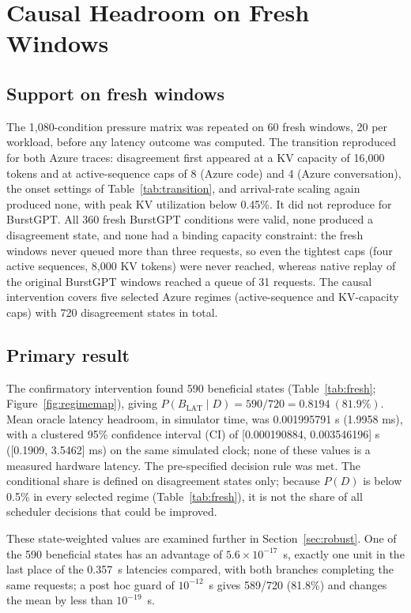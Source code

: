 \documentclass[preprint,12pt]{elsarticle}
\begin{document}
\section{Causal Headroom on Fresh Windows}
\label{sec:fresh}

\subsection{Support on fresh windows}
The 1,080-condition pressure matrix was repeated on 60 fresh windows, 20 per
workload, before any latency outcome was computed. The transition reproduced
for both Azure traces: disagreement first appeared at a KV capacity of 16,000
tokens and at active-sequence caps of 8 (Azure code) and 4 (Azure conversation),
the onset settings of Table~\ref{tab:transition}, and arrival-rate scaling again
produced none, with peak KV utilization below 0.45\%. It did not
reproduce for BurstGPT. All 360 fresh BurstGPT conditions were valid, none
produced a disagreement state, and none had a binding capacity constraint: the
fresh windows never queued more than three requests, so even the tightest
caps (four active sequences, 8,000 KV tokens) were never reached, whereas native
replay of the original BurstGPT windows reached a queue of 31 requests. The
causal intervention covers five selected Azure regimes
(active-sequence and KV-capacity caps) with 720 disagreement states in total.

\subsection{Primary result}
The confirmatory intervention found 590 beneficial
states (Table~\ref{tab:fresh}; Figure~\ref{fig:regimemap}), giving
$P(B_{\mathrm{LAT}}\mid D)=590/720=0.8194\ (81.9\%)$.
Mean oracle latency headroom, in simulator time, was 0.001995791 s (1.9958 ms),
with a clustered 95\% confidence interval (CI) of [0.000190884, 0.003546196] s
([0.1909, 3.5462] ms) on the same simulated clock; none of these values is a
measured hardware latency. The pre-specified decision rule was met. The conditional
share is defined on disagreement states only; because $P(D)$ is below 0.5\% in
every selected regime (Table~\ref{tab:fresh}), it is not the share of all
scheduler decisions that could be improved.

These state-weighted values are examined further in Section~\ref{sec:robust}.
One of the 590 beneficial states has an advantage of $5.6\times10^{-17}$~s,
exactly one unit in the last place of the 0.357~s latencies compared, with both
branches completing the same requests; a post hoc guard of $10^{-12}$~s gives
589/720 (81.8\%) and changes the mean by less than $10^{-19}$~s.
\end{document}
